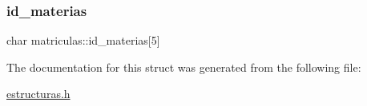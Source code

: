 \mbox{\label{structmatriculas_a6433d557ea453570a08401f83be557d0}} 
\subsubsection{\texorpdfstring{id\+\_\+materias}{id\_materias}}
{\footnotesize\ttfamily char matriculas\+::id\+\_\+materias\mbox{[}5\mbox{]}}



The documentation for this struct was generated from the following file\+:\begin{DoxyCompactItemize}
\item 
\mbox{\hyperlink{estructuras_8h}{estructuras.\+h}}\end{DoxyCompactItemize}
